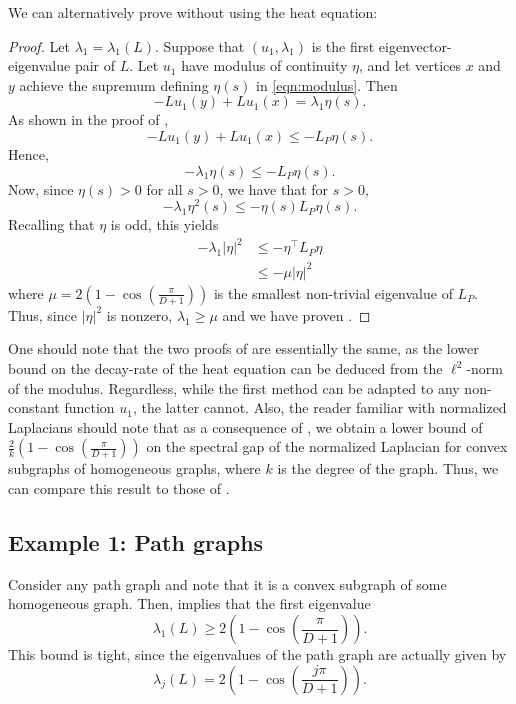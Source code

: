 We can alternatively prove  without using the heat equation:
\begin{proof}
	Let $\lambda_1 = \lambda_1(L)$. Suppose that $(u_1,\lambda_1)$ is the first eigenvector-eigenvalue pair of $L$. Let $u_1$ have modulus of continuity $\eta$, and let vertices $x$ and $y$ achieve the supremum defining $\eta(s)$ in \cref{eqn:modulus}. Then
	\begin{equation*}
	-L u_1(y) + L u_1(x) = \lambda_1 \eta(s).
	\end{equation*}
	As shown in the proof of ,
	\begin{equation*}
		-L u_1(y) + Lu_1(x) \leq -L_P \eta(s).
	\end{equation*}
	Hence,
	\begin{equation*}
	-\lambda_1 \eta(s) \leq -L_P \eta(s).
	\end{equation*}
	Now, since $\eta(s) > 0$ for all $s>0$, we have that for $s>0$,
	\begin{equation*}
		-\lambda_1 \eta^2(s) \leq -\eta(s)L_P\eta(s).
	\end{equation*}
	Recalling that $\eta$ is odd, this yields
	\begin{align*}
		-\lambda_1 \lvert \eta \rvert^2 &\leq - \eta^{\top} L_P \eta \\
		&\leq - \mu \lvert \eta \rvert^2
	\end{align*}
	where $\mu= 2\left(1-\cos\left(\frac{\pi}{D+1}\right)\right)$ is the smallest non-trivial eigenvalue of $L_P$. Thus, since $\lvert \eta \rvert^2$ is nonzero, $\lambda_1 \geq \mu$ and we have proven .
\end{proof}

One should note that the two proofs of  are essentially the same, as the lower bound on the decay-rate of the heat equation can be deduced from the $\ell^2$-norm of the modulus. Regardless, while the first method can be adapted to any non-constant function $u_1$, the latter cannot. Also, the reader familiar with normalized Laplacians should note that as a consequence of , we obtain a lower bound of $\frac{2}{k}\left(1-\cos\left(\frac{\pi}{D+1}\right)\right)$ on the spectral gap of the normalized Laplacian for convex subgraphs of homogeneous graphs, where $k$ is the degree of the graph. Thus, we can compare this result to those of \cite{Chung1994,Chung}.

\subsection{Example 1: Path graphs}
Consider any path graph and note that it is a convex subgraph of some homogeneous graph. Then,  implies that the first eigenvalue 
\begin{equation*}
\lambda_1(L) \geq 2\left(1-\cos\left(\frac{\pi}{D+1}\right)\right).
\end{equation*}
 This bound is tight, since the eigenvalues of the path graph are actually given by 
 \begin{equation*}
 \lambda_j(L) = 2 \left(1-\cos\left(\frac{j \pi}{D+1}\right)\right).
 \end{equation*}

